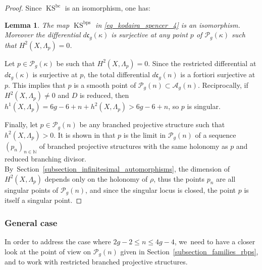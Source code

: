 \documentclass[10pt]{amsart}
\newcommand{\N}{\mathbb N}
\newcommand{\BC}{\mathrm{bc}}
\newcommand{\BPS}{\mathrm{bps}}
\DeclareMathOperator{\KS}{KS}
\theoremstyle{definition}
\theoremstyle{plain}
\newtheorem{lemma}[definition]{Lemma}
\begin{document}
\begin{proof}
Since $\KS^{\BC}$ is an isomorphism, one has:

\begin{lemma}
The map $\KS^{\BPS}$ in \eqref{eq_kodaira_spencer_4} is an isomorphism.
Moreover the differential $d\mathfrak c_g(\kappa)$ is surjective at any point $p$ of $\mathcal P_g(\kappa)$ such that $H^2\left(X, \Lambda_p\right)=0$.
\end{lemma}

Let $p \in \mathcal P_g(\kappa)$ be such that $H^2\left(X, \Lambda_p\right) = 0$.
Since the restricted differential at $d\mathfrak c_g(\kappa)$ is surjective at $p$, the total differential $d\mathfrak c_g(n)$ is a fortiori surjective at $p$.
This implies that $p$ is a smooth point of $\mathcal P_g(n) \subset \mathcal A_g(n)$.
Reciprocally, if $H^2\left(X, \Lambda_p\right) \neq 0$ and $D$ is reduced, then $h^1\left(X, \Lambda_p\right) = 6g-6+n+h^2\left(X, \Lambda_p\right) > 6g-6+n$, so $p$ is singular.

Finally, let $p \in \mathcal P_g(n)$ be any branched projective structure such that \hbox{$h^2(X, \Lambda_p) > 0$}.
It is shown in \cite{calsamiglia-deroin-francaviglia} that $p$ is the limit in $\mathcal P_g(n)$ of a sequence $\left(p_n\right)_{n \in \N}$ of branched projective structures with the same holonomy as $p$ and reduced branching divisor.
By~Section~\ref{subsection_infinitesimal_automorphisms}, the dimension of $H^2\left(X, \Lambda_p\right)$ depends only on the holonomy of $\rho$, thus the points $p_n$ are all singular points of $\mathcal P_g(n)$, and since the singular locus is closed, the point $p$ is itself a singular point.
\end{proof}

\subsubsection{General case}\label{subsubsection_singular_points_general_case}

In order to address the case where $2g-2 \le n \le 4g-4$, we~need to have a closer look at the point of view on $\mathcal P_g(n)$ given in Section~\ref{subsection_families_rbps}, and to work with restricted branched projective structures.
\end{document}
